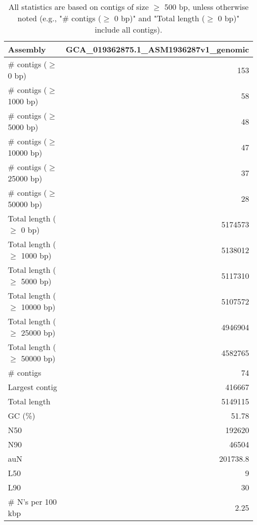 \documentclass[12pt,a4paper]{article}
\begin{document}
\begin{table}[ht]
\begin{center}
\caption{All statistics are based on contigs of size $\geq$ 500 bp, unless otherwise noted (e.g., "\# contigs ($\geq$ 0 bp)" and "Total length ($\geq$ 0 bp)" include all contigs).}
\begin{tabular}{|l*{1}{|r}|}
\hline
Assembly & GCA\_019362875.1\_ASM1936287v1\_genomic \\ \hline
\# contigs ($\geq$ 0 bp) & 153 \\ \hline
\# contigs ($\geq$ 1000 bp) & 58 \\ \hline
\# contigs ($\geq$ 5000 bp) & 48 \\ \hline
\# contigs ($\geq$ 10000 bp) & 47 \\ \hline
\# contigs ($\geq$ 25000 bp) & 37 \\ \hline
\# contigs ($\geq$ 50000 bp) & 28 \\ \hline
Total length ($\geq$ 0 bp) & 5174573 \\ \hline
Total length ($\geq$ 1000 bp) & 5138012 \\ \hline
Total length ($\geq$ 5000 bp) & 5117310 \\ \hline
Total length ($\geq$ 10000 bp) & 5107572 \\ \hline
Total length ($\geq$ 25000 bp) & 4946904 \\ \hline
Total length ($\geq$ 50000 bp) & 4582765 \\ \hline
\# contigs & 74 \\ \hline
Largest contig & 416667 \\ \hline
Total length & 5149115 \\ \hline
GC (\%) & 51.78 \\ \hline
N50 & 192620 \\ \hline
N90 & 46504 \\ \hline
auN & 201738.8 \\ \hline
L50 & 9 \\ \hline
L90 & 30 \\ \hline
\# N's per 100 kbp & 2.25 \\ \hline
\end{tabular}
\end{center}
\end{table}
\end{document}
